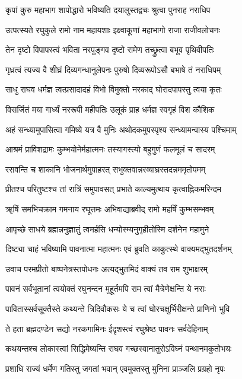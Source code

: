 \twolineshloka
{कृपां कुरु महाभाग शापोद्धारो भविष्यति}
{दयालुस्तद्वचः श्रुत्वा पुनराह नराधिप}%

\twolineshloka
{उत्पत्स्यते रघुकुले रामो नाम महायशाः}
{इक्ष्वाकूणां महाभागो राजा राजीवलोचनः}%

\twolineshloka
{तेन दृष्टो विपापस्त्वं भविता नरपुङ्गव}
{दृष्टो रामेण तच्छ्रुत्वा बभूव पृथिवीपतिः}%

\twolineshloka
{गृध्रत्वं त्यज्य वै शीघ्रं दिव्यगन्धानुलेपनः}
{पुरुषो दिव्यरूपोऽसौ बभाषे तं नराधिपम्}%

\twolineshloka
{साधु राघव धर्मज्ञ त्वत्प्रसादादहं विभो}
{विमुक्तो नरकाद् घोरादपापस्तु त्वया कृतः}%

\twolineshloka
{विसर्जितं मया गार्ध्यं नररूपी महीपतिः}
{उलूकं प्राह धर्मज्ञ स्वगृहं विश कौशिक}%

\twolineshloka
{अहं सन्ध्यामुपासित्वा गमिष्ये यत्र वै मुनिः}
{अथोदकमुपस्पृश्य सन्ध्यामन्वास्य पश्चिमाम्}%

\twolineshloka
{आश्रमं प्राविशद्रामः कुम्भयोनेर्महात्मनः}
{तस्यागस्त्यो बहुगुणं फलमूलं च सादरम्}%

\twolineshloka
{रसवन्ति च शाकानि भोजनार्थमुपाहरत्}
{सभुक्तवान्नरव्याघ्रस्तदन्नममृतोपमम्}%

\twolineshloka
{प्रीतश्च परितुष्टश्च तां रात्रिं समुपावसत्}
{प्रभाते काल्यमुत्थाय कृत्वाह्निकमरिन्दम}%

\twolineshloka
{ॠषिं समभिचक्राम गमनाय रघूत्तमः}
{अभिवाद्याब्रवीद् रामो महर्षिं कुम्भसम्भवम्}%

\twolineshloka
{आपृच्छे साधये ब्रह्मन्ननुज्ञातुं त्वमर्हसि}
{धन्योस्म्यनुगृहीतोस्मि दर्शनेन महामुने}%

\twolineshloka
{दिष्ट्या चाहं भविष्यामि पावनात्मा महात्मनः}
{एवं ब्रुवति काकुत्स्थे वाक्यमद्भुतदर्शनम्}%

\twolineshloka
{उवाच परमप्रीतो बाष्पनेत्रस्तपोधनः}
{अत्यद्भुतमिदं वाक्यं तव राम शुभाक्षरम्}%

\twolineshloka
{पावनं सर्वभूतानां त्वयोक्तं रघुनन्दन}
{मुहूर्तमपि राम त्वां मैत्रेणेक्षन्ति ये नराः}%

\twolineshloka
{पावितास्सर्वसूक्तैस्ते कथ्यन्ते त्रिदिवौकसः}
{ये च त्वां घोरचक्षुर्भिरीक्षन्ते प्राणिनो भुवि}%

\twolineshloka
{ते हता ब्रह्मदण्डेन सद्यो नरकगामिनः}
{ईदृशस्त्वं रघुश्रेष्ठ पावनः सर्वदेहिनाम्}%

\twolineshloka
{कथयन्तश्च लोकास्त्वां सिद्धिमेष्यन्ति राघव}
{गच्छस्वानातुरोऽविघ्नं पन्थानमकुतोभयः}%

\twolineshloka
{प्रशाधि राज्यं धर्मेण गतिस्तु जगतां भवान्}
{एवमुक्तस्तु मुनिना प्राञ्जलि प्रग्रहो नृपः}%

